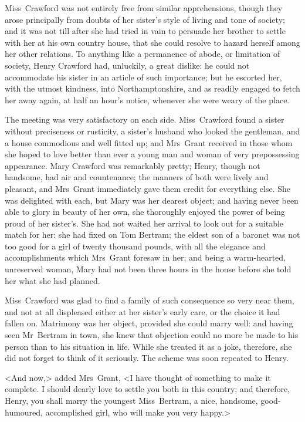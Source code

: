 Miss~Crawford was not entirely free from similar apprehensions, though they arose principally from doubts of her sister's style of living and tone of society; and it was not till after she had tried in vain to persuade her brother to settle with her at his own country house, that she could resolve to hazard herself among her other relations. To anything like a permanence of abode, or limitation of society, Henry Crawford had, unluckily, a great dislike: he could not accommodate his sister in an article of such importance; but he escorted her, with the utmost kindness, into Northamptonshire, and as readily engaged to fetch her away again, at half an hour's notice, whenever she were weary of the place.

The meeting was very satisfactory on each side. Miss~Crawford found a sister without preciseness or rusticity, a sister's husband who looked the gentleman, and a house commodious and well fitted up; and Mrs~Grant received in those whom she hoped to love better than ever a young man and woman of very prepossessing appearance. Mary Crawford was remarkably pretty; Henry, though not handsome, had air and countenance; the manners of both were lively and pleasant, and Mrs~Grant immediately gave them credit for everything else. She was delighted with each, but Mary was her dearest object; and having never been able to glory in beauty of her own, she thoroughly enjoyed the power of being proud of her sister's. She had not waited her arrival to look out for a suitable match for her: she had fixed on Tom Bertram; the eldest son of a baronet was not too good for a girl of twenty thousand pounds, with all the elegance and accomplishments which Mrs~Grant foresaw in her; and being a warm-hearted, unreserved woman, Mary had not been three hours in the house before she told her what she had planned.

Miss~Crawford was glad to find a family of such consequence so very near them, and not at all displeased either at her sister's early care, or the choice it had fallen on. Matrimony was her object, provided she could marry well: and having seen Mr~Bertram in town, she knew that objection could no more be made to his person than to his situation in life. While she treated it as a joke, therefore, she did not forget to think of it seriously. The scheme was soon repeated to Henry.

<And now,> added Mrs~Grant, <I have thought of something to make it complete. I should dearly love to settle you both in this country; and therefore, Henry, you shall marry the youngest Miss~Bertram, a nice, handsome, good-humoured, accomplished girl, who will make you very happy.>

